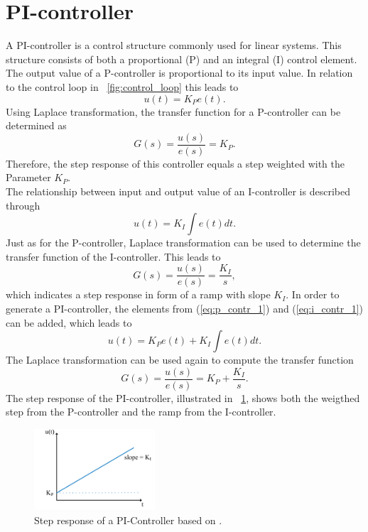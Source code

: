 \section{PI-controller}
A PI-controller is a control structure commonly used for linear systems. This structure consists of both a proportional (P) and an integral (I) control element.
The output value of a P-controller is proportional to its input value. In relation to the control loop in \figurename~\ref{fig:control_loop} this leads to
\begin{equation}
    u(t) = K_{P}e(t).
 \label{eq:p_contr_1}
\end{equation}
Using Laplace transformation, the transfer function for a P-controller can be determined as
\begin{equation}
    G(s) = \frac{u(s)}{e(s)} = K_{P}.
 \label{eq:p_contr_2}
\end{equation}
Therefore, the step response of this controller equals a step weighted with the Parameter $K_{P}$.
\\The relationship between input and output value of an I-controller is described through
\begin{equation}
    u(t) = K_{I}\int e(t) dt.
 \label{eq:i_contr_1}
\end{equation}
Just as for the P-controller, Laplace transformation can be used to determine the transfer function of the I-controller.
This leads to
\begin{equation}
    G(s) = \frac{u(s)}{e(s)} = \frac{K_{I}}{s},
 \label{eq:i_contr_2}
\end{equation}
which indicates a step response in form of a ramp with slope $K_{I}$.
In order to generate a PI-controller, the elements from (\ref{eq:p_contr_1}) and (\ref{eq:i_contr_1}) can be added, which leads to
\begin{equation}
    u(t) = K_{P}e(t) + K_{I}\int e(t) dt.
 \label{eq:pi_contr_1}
\end{equation}
The Laplace transformation can be used again to compute the transfer function
\begin{equation}
    G(s) = \frac{u(s)}{e(s)} =  K_{P} + \frac{K_{I}}{s}.
 \label{eq:pi_contr_2}
\end{equation}
The step response of the PI-controller, illustrated in \figurename~\ref{fig:step_resp_pi}, shows both the weigthed step from the P-controller and the ramp from the I-controller.

\begin{figure}[h]
   \centering
   \includegraphics[width=0.4\textwidth]{images/step_resp_pi.pdf}
   \caption[Step response of a PI-Controller]{Step response of a PI-Controller based on \cite{Reg_17}.}
   \label{fig:step_resp_pi}
 \end{figure}

